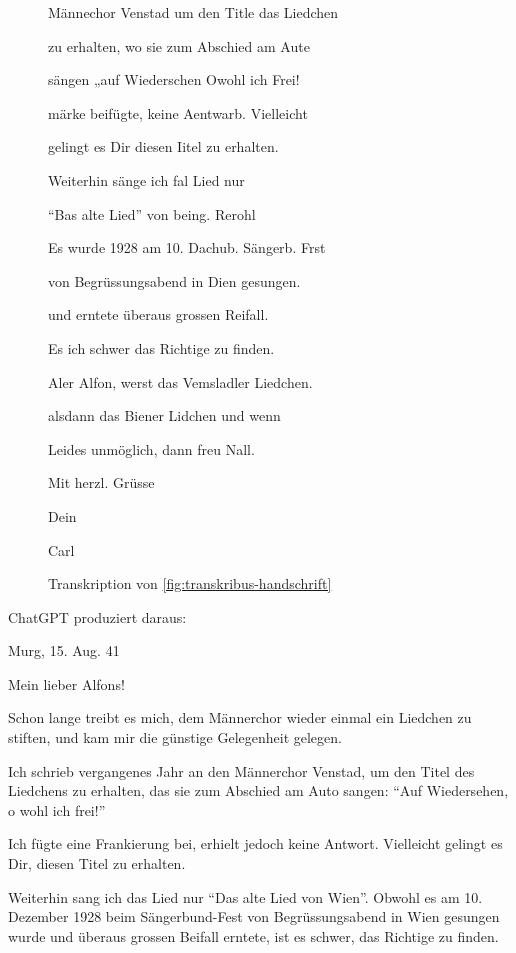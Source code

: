 \documentclass[12pt, a4paper, ngerman, bidi=default]{article}
\begin{document}
\begin{description}
\begin{figure}[htbp]
\begin{tcolorbox}[colback=oldLetter, colframe=black, sharp corners, width=\textwidth]
    Männechor Venstad um den Title das Liedchen 

    zu erhalten, wo sie zum Abschied am Aute 

    sängen „auf Wiederschen Owohl ich Frei! 

    märke beifügte, keine Aentwarb. Vielleicht 

    gelingt es Dir diesen Iitel zu erhalten. 
    
    Weiterhin sänge ich fal Lied nur 
    
    ``Bas alte Lied'' von being. Rerohl 

    Es wurde 1928 am 10. Dachub. Sängerb. Frst 

    von Begrüssungsabend in Dien gesungen. 

    und erntete überaus grossen Reifall. 

    Es ich schwer das Richtige zu finden. 

    Aler Alfon, werst das Vemsladler Liedchen. 

    alsdann das Biener Lidchen und wenn 

    Leides unmöglich, dann freu Nall. 

    Mit herzl. Grüsse 

    Dein 

    Carl 
  \end{tcolorbox}
  \caption{Transkription von \autoref{fig:transkribus-handschrift}}
  \label{fig:transkription-brief}

\end{figure}

ChatGPT produziert daraus:

\begin{tcolorbox}[colback=oldLetter, colframe=black, sharp corners, width=\textwidth]
Murg, 15. Aug. 41

Mein lieber Alfons!

Schon lange treibt es mich, dem Männerchor wieder einmal ein Liedchen zu stiften, und kam mir die günstige Gelegenheit gelegen.

Ich schrieb vergangenes Jahr an den Männerchor Venstad, um den Titel des Liedchens zu erhalten, das sie zum Abschied am Auto sangen: \enquote{Auf Wiedersehen, o wohl ich frei!}

Ich fügte eine Frankierung bei, erhielt jedoch keine Antwort. Vielleicht gelingt es Dir, diesen Titel zu erhalten.

Weiterhin sang ich das Lied nur \enquote{Das alte Lied von Wien}. Obwohl es am 10. Dezember 1928 beim Sängerbund-Fest von Begrüssungsabend in Wien gesungen wurde und überaus grossen Beifall erntete, ist es schwer, das Richtige zu finden.


\end{tcolorbox}
\end{description}
\end{document}
